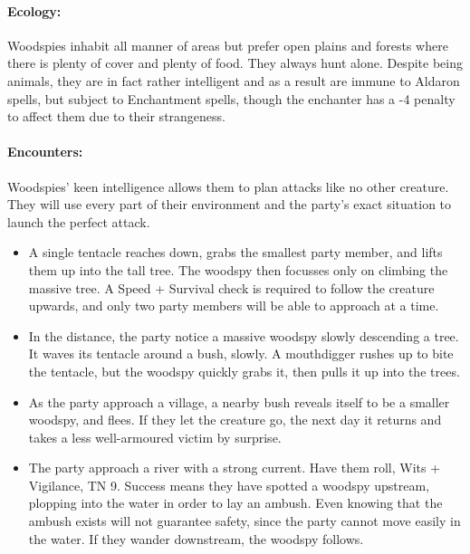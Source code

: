 \begin{multicols}{2}
\paragraph{Ecology:} Woodspies inhabit all manner of areas but prefer open plains and forests where there is plenty of cover and plenty of food.  They always hunt alone.  Despite being animals, they are in fact rather intelligent and as a result are immune to Aldaron spells, but subject to Enchantment spells, though the enchanter has a -4 penalty to affect them due to their strangeness.

\paragraph{Encounters:} Woodspies' keen intelligence allows them to plan attacks like no other creature.
They will use every part of their environment and the party's exact situation to launch the perfect attack.

\begin{itemize}

	\item{A single tentacle reaches down, grabs the smallest party member, and lifts them up into the tall tree.
	The woodspy then focusses only on climbing the massive tree.
	A Speed + Survival check is required to follow the creature upwards, and only two party members will be able to approach at a time.}
	\item{In the distance, the party notice a massive woodspy slowly descending a tree.
	It waves its tentacle around a bush, slowly.
	A mouthdigger rushes up to bite the tentacle, but the woodspy quickly grabs it, then pulls it up into the trees.}
	\item{As the party approach a village, a nearby bush reveals itself to be a smaller woodspy, and flees.
	If they let the creature go, the next day it returns and takes a less well-armoured victim by surprise.}
	\item{The party approach a river with a strong current.
	Have them roll, Wits + Vigilance, TN 9.
	Success means they have spotted a woodspy upstream, plopping into the water in order to lay an ambush.
	Even knowing that the ambush exists will not guarantee safety, since the party cannot move easily in the water.
	If they wander downstream, the woodspy follows.}

\end{itemize}

\end{multicols}

